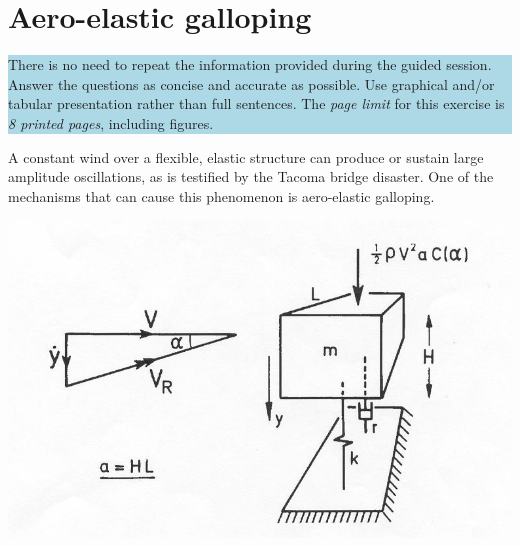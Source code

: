 \chapter{Aero-elastic galloping}

\begin{center}
\colorbox{LightBlue}{\parbox{1\textwidth}{ There is no need to repeat the information provided during the guided session. Answer the questions as concise and accurate as possible. Use graphical and/or tabular presentation rather than full sentences. The \textit{page limit} 
for this exercise is \textit{8 printed pages}, including figures.}}
\end{center}

A constant wind over a flexible, elastic structure can produce or sustain large amplitude oscillations,
as is testified by the Tacoma bridge disaster. One of the mechanisms that can cause this phenomenon is
aero-elastic galloping.\\

\begin{center}
\includegraphics[scale=0.39]{gallop1.jpg}
\end{center}

